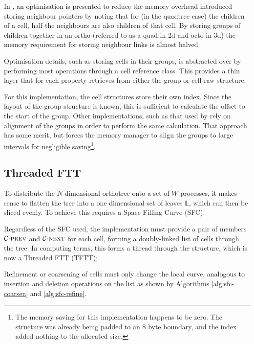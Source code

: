 \documentclass{IIBproject}
\newcommand{\acc}{{\mkern 0.5mu\cdot\mkern 0.5mu}}
\numberwithin{figure}{section}
\begin{document}
        In \cite{Khokhlov98}, an optimisation is presented to reduce the memory overhead introduced storing neighbour pointers by noting that for (in the quadtree case) the children of a cell, half the neighbours are also children of that cell. By storing groups of children together in an ortho (referred to as a quad in 2d and octo in 3d) the memory requirement for storing neighbour links is almost halved.

        Optimisation details, such as storing cells in their groups, is abstracted over by performing most operations through a cell reference class. This provides a thin layer that for each property retrieves from either the group or cell raw structure. 

        For this implementation, the cell structures store their own index. Since the layout of the group structure is known, this is sufficient to calculate the offset to the start of the group. Other implementations, such as that used by \cite{Yung2010} rely on alignment of the groups in order to perform the same calculation. That approach has some merit, but forces the memory manager to align the groups to large intervals for negligible saving\footnote{The memory saving for this implementation happens to be zero. The structure was already being padded to an 8 byte boundary, and the index added nothing to the allocated size. }.



    \subsection{Threaded FTT} %
        \label{sec:tftt}

        To distribute the $N$ dimensional orthotree onto a set of $W$ processes, it makes sense to flatten the tree into a one dimensional set of leaves $\mathbb{L}$, which can then be sliced evenly. To achieve this requires a Space Filling Curve (SFC). 

        Regardless of the SFC used, the implementation must provide a pair of members $\mathcal{C}\acc\textproc{prev}$ and $\mathcal{C}\acc\textproc{next}$ for each cell, forming a doubly-linked list of cells through the tree. In computing terms, this forms a thread through the structure, which is now a Threaded FTT (TFTT);

        Refinement or coarsening of cells must only change the local curve, analogous to insertion and deletion operations on the list as shown by Algorithms \ref{alg:sfc-coarsen} and \ref{alg:sfc-refine}.
\end{document}
